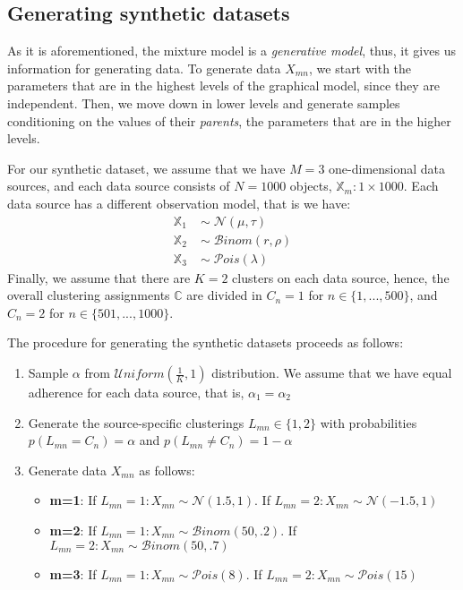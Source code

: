 \subsection{Generating synthetic datasets} \label{integr-synth-data-sect}
As it is aforementioned, the mixture model is a \emph{generative model}, thus, it gives us information for generating data. To generate data $X_{mn}$, we start with the parameters that are in the highest levels of the graphical model, since they are independent. Then, we move down in lower levels and generate samples conditioning on the values of their \emph{parents}, \ie the parameters that are in the higher levels. 

For our synthetic dataset, we assume that we have $M=3$ one-dimensional data sources, and each data source consists of $N=1000$ objects, \ie $\mathbb{X}_{m} : 1 \times 1000$. Each data source has a different observation model, that is we have:
\begin{equation*}
  \begin{aligned}
  	\mathbb{X}_{1} \; & \sim \; \mathcal{N}(\mu, \tau) \\
  	\mathbb{X}_{2} \; & \sim \; \mathcal{B}inom(r, \rho) \\
  	\mathbb{X}_{3} \; & \sim \; \mathcal{P}ois(\lambda)
  \end{aligned}
\end{equation*}
Finally, we assume that there are $K=2$ clusters on each data source, hence, the overall clustering assignments $\mathbb{C}$ are divided in $C_{n}=1$ for $n \in \lbrace 1,...,500 \rbrace$, and $C_{n}=2$ for $n \in \lbrace 501,...,1000 \rbrace$. 

The procedure for generating the synthetic datasets proceeds as follows:
\begin{enumerate}
	\item{
		Sample $\alpha$ from $\mathcal{U}niform(\frac{1}{K}, 1)$ distribution. We assume that we have equal adherence for each data source, that is, $\alpha_{1} = \alpha_{2}$
	}
	\item{
		Generate the source-specific clusterings $L_{mn} \in \lbrace 1,2 \rbrace$ with probabilities $p(L_{mn} = C_{n}) = \alpha$ and $p(L_{mn} \neq C_{n}) = 1 - \alpha$
	}
	\item{
		Generate data $X_{mn}$ as follows:
		\begin{itemize}
			\item{
				\textbf{m=1}: If $L_{mn}=1 : X_{mn} \sim \mathcal{N}(1.5, 1)$. If $L_{mn}=2 : X_{mn} \sim \mathcal{N}(-1.5, 1)$
			}
			\item{ 
				\textbf{m=2}: If $L_{mn}=1 : X_{mn} \sim \mathcal{B}inom(50, .2)$. If $L_{mn}=2 : X_{mn} \sim \mathcal{B}inom(50, .7)$
			}
			\item{ 
				\textbf{m=3}: If $L_{mn}=1 : X_{mn} \sim \mathcal{P}ois(8)$. If $L_{mn}=2 : X_{mn} \sim \mathcal{P}ois(15)$
			}
		\end{itemize}	
	}
\end{enumerate}

